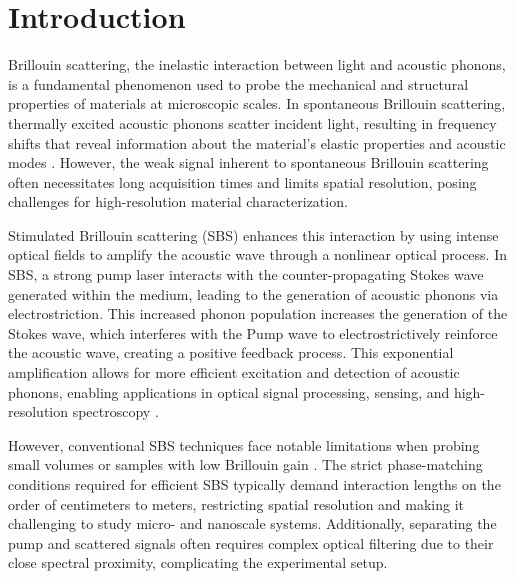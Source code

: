 \documentclass[%
  reprint,
  superscriptaddress,
  amsmath,amssymb,
  aps,
  prapplied,
]{revtex4-2}
\begin{document}
\maketitle



\section{Introduction}
\label{sec:Introduction}

Brillouin scattering, the inelastic interaction between light and acoustic phonons, is a fundamental phenomenon used to probe the mechanical and structural properties of materials at microscopic scales. In spontaneous Brillouin scattering, thermally excited acoustic phonons scatter incident light, resulting in frequency shifts that reveal information about the material's elastic properties and acoustic modes \cite{boyd2020nonlinear}. However, the weak signal inherent to spontaneous Brillouin scattering often necessitates long acquisition times and limits spatial resolution, posing challenges for high-resolution material characterization.

Stimulated Brillouin scattering (SBS) enhances this interaction by using intense optical fields to amplify the acoustic wave through a nonlinear optical process. In SBS, a strong pump laser interacts with the counter-propagating Stokes wave generated within the medium, leading to the generation of acoustic phonons via electrostriction. This increased phonon population increases the generation of the Stokes wave, which interferes with the Pump wave to electrostrictively reinforce the acoustic wave, creating a positive feedback process. This exponential amplification allows for more efficient excitation and detection of acoustic phonons, enabling applications in optical signal processing, sensing, and high-resolution spectroscopy \cite{eggleton2013inducing, fotiadi2023brillouin, kobyakov2009stimulated, ippen1972stimulated}.

However, conventional SBS techniques face notable limitations when probing small volumes or samples with low Brillouin gain \cite{rakich2012giant, gyger2020observation}. The strict phase-matching conditions required for efficient SBS typically demand interaction lengths on the order of centimeters to meters, restricting spatial resolution and making it challenging to study micro- and nanoscale systems. Additionally, separating the pump and scattered signals often requires complex optical filtering due to their close spectral proximity, complicating the experimental setup.
\end{document}
